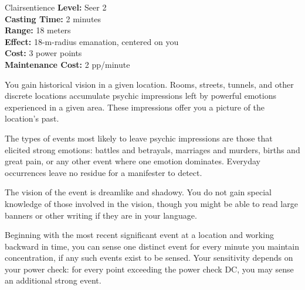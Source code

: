 {Clairsentience}
{
	\textbf{Level:}
	Seer 2\\
	\textbf{Casting Time:}
	2 minutes\\
	\textbf{Range:}
	18 meters\\
	\textbf{Effect:}
	18-m-radius emanation, centered on you\\
	\textbf{Cost:}
	3 power points\\
	\textbf{Maintenance Cost:}
	2 pp/minute\\
}
{
	You gain historical vision in a given location. Rooms, streets, tunnels, and other discrete locations accumulate psychic impressions left by powerful emotions experienced in a given area. These impressions offer you a picture of the location's past.

	The types of events most likely to leave psychic impressions are those that elicited strong emotions: battles and betrayals, marriages and murders, births and great pain, or any other event where one emotion dominates. Everyday occurrences leave no residue for a manifester to detect.

	The vision of the event is dreamlike and shadowy. You do not gain special knowledge of those involved in the vision, though you might be able to read large banners or other writing if they are in your language.

	Beginning with the most recent significant event at a location and working backward in time, you can sense one distinct event for every minute you maintain concentration, if any such events exist to be sensed. Your sensitivity depends on your power check: for every point exceeding the power check DC, you may sense an additional strong event.
}